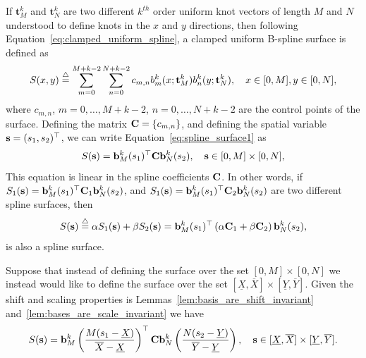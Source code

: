 If $\mathbf{t}_M^k$ and $\mathbf{t}_N^k$ are two different $k^{th}$ order uniform knot vectors of length $M$ and $N$ understood to define knots in the $x$ and $y$ directions, then following Equation~\eqref{eq:clamped_uniform_spline}, a clamped uniform B-spline surface is defined as 
\begin{equation}\label{eq:spline_surface1}
S(x, y) \defeq \sum_{m=0}^{M+k-2} \sum_{n=0}^{N+k-2} c_{m,n} b^k_m(x; \mathbf{t}_M^k) b^k_n(y; \mathbf{t}_N^k), \quad x\in[0,M], y\in[0, N],
\end{equation}
where $c_{m, n}$, $m=0, \dots, M+k-2$, $n=0, \dots, N+k-2$ are the control points of the surface.  Defining the matrix $\mathbf{C}=\{c_{m,n}\}$, and defining the spatial variable $\mathbf{s} = (s_1, s_2)^\top$, we can write Equation~\eqref{eq:spline_surface1} as
\begin{equation}\label{eq:spline_surface2}
S(\sbf) = \bbf^k_M(s_1)^\top \Cbf \bbf^k_N(s_2), \quad \sbf\in[0, M]\times[0, N],
\end{equation}
This equation is linear in the spline coefficients $\mathbf{C}$.  In other words, if $S_1(\mathbf{s})=\mathbf{b}^k_M(s_1)^\top \mathbf{C}_1 \mathbf{b}^k_N(s_2)$, and $S_1(\mathbf{s})=\mathbf{b}^k_M(s_1)^\top \mathbf{C}_2 \mathbf{b}^k_N(s_2)$ are two different spline surfaces, then 
\[
S(\mathbf{s})\stackrel{\triangle}{=} \alpha S_1(\mathbf{s}) + \beta S_2(\mathbf{s}) = \mathbf{b}^k_M(s_1)^\top \left(\alpha\mathbf{C}_1 + \beta\mathbf{C}_2\right) \mathbf{b}^k_N(s_2),
\]
is also a spline surface.

Suppose that instead of defining the surface over the set $[0, M]\times[0, N]$ we instead would like to define the surface over the set $[\underline{X}, \overline{X}]\times[\underline{Y}, \overline{Y}]$.  Given the shift and scaling properties is Lemmas~\ref{lem:basis_are_shift_invariant} and~\ref{lem:bases_are_scale_invariant} we have 
\begin{equation}\label{eq:spline_surface3}
S(\sbf) = \bbf^k_M\left(\frac{M(s_1-\underline{X})}{\overline{X}-\underline{X}}\right)^\top \Cbf \bbf^k_N\left(\frac{N(s_2-\underline{Y})}{\overline{Y}-\underline{Y}}\right), \quad \sbf\in[\underline{X}, \overline{X}]\times[\underline{Y}, \overline{Y}].
\end{equation}

